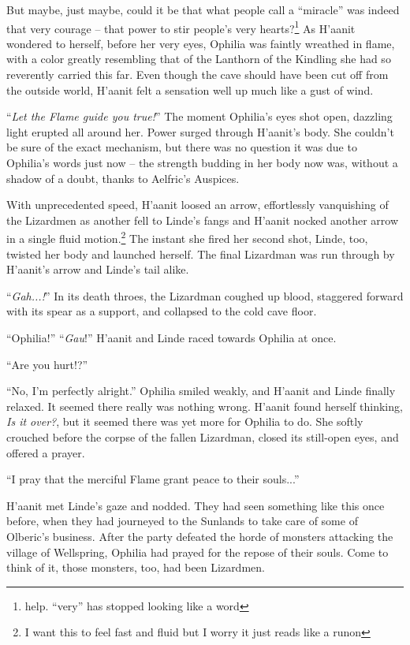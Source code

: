 But maybe, just maybe, could it be that what people call a ``miracle'' was indeed that very courage -- that power to stir people's very hearts?\footnote{help. ``very'' has stopped looking like a word} As H'aanit wondered to herself, before her very eyes, Ophilia was faintly wreathed in flame, with a color greatly resembling that of the Lanthorn of the Kindling she had so reverently carried this far. Even though the cave should have been cut off from the outside world, H'aanit felt a sensation well up much like a gust of wind.

``\emph{Let the Flame guide you true!}'' The moment Ophilia's eyes shot open, dazzling light erupted all around her. Power surged through H'aanit's body. She couldn't be sure of the exact mechanism, but there was no question it was due to Ophilia's words just now -- the strength budding in her body now was, without a shadow of a doubt, thanks to Aelfric's Auspices.

With unprecedented speed, H'aanit loosed an arrow, effortlessly vanquishing of the Lizardmen as another fell to Linde's fangs and H'aanit nocked another arrow in a single fluid motion.\footnote{I want this to feel fast and fluid but I worry it just reads like a runon} The instant she fired her second shot, Linde, too, twisted her body and launched herself. The final Lizardman was run through by H'aanit's arrow and Linde's tail alike.

``\emph{Gah...!}'' In its death throes, the Lizardman coughed up blood, staggered forward with its spear as a support, and collapsed to the cold cave floor.

``Ophilia!'' ``\emph{Gau}!'' H'aanit and Linde raced towards Ophilia at once.

``Are you hurt!?''

``No, I'm perfectly alright.'' Ophilia smiled weakly, and H'aanit and Linde finally relaxed. It seemed there really was nothing wrong. H'aanit found herself thinking, \emph{Is it over?}, but it seemed there was yet more for Ophilia to do. She softly crouched before the corpse of the fallen Lizardman, closed its still-open eyes, and offered a prayer.

``I pray that the merciful Flame grant peace to their souls...'' 

H'aanit met Linde's gaze and nodded. They had seen something like this once before, when they had journeyed to the Sunlands to take care of some of Olberic's business. After the party defeated the horde of monsters attacking the village of Wellspring, Ophilia had prayed for the repose of their souls. Come to think of it, those monsters, too, had been Lizardmen. 


